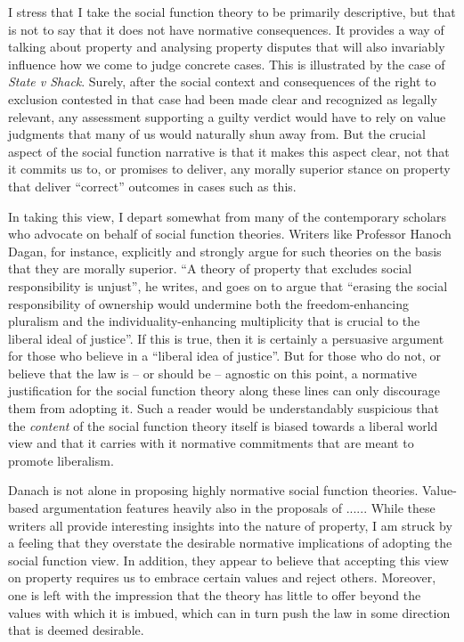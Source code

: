 I stress that I take the social function theory to be primarily descriptive, but that is not to say that it does not have normative consequences. It provides a way of talking about property and analysing property disputes that will also invariably influence how we come to judge concrete cases. This is illustrated by the case of {\it State v Shack}. Surely, after the social context and consequences of the right to exclusion contested in that case had been made clear and recognized as legally relevant, any assessment supporting a guilty verdict would have to rely on value judgments that many of us would naturally shun away from. But the crucial aspect of the social function narrative is that it makes this aspect clear, not that it commits us to, or promises to deliver, any morally superior  stance on property that deliver ``correct'' outcomes in cases such as this.

In taking this view, I depart somewhat from many of the contemporary scholars who advocate on behalf of social function theories. Writers like Professor Hanoch Dagan, for instance, explicitly and strongly argue for such theories on the basis that they are morally superior. ``A theory of property that excludes social responsibility is unjust'', he writes, and goes on to argue that ``erasing the social responsibility of ownership would undermine both the freedom-enhancing pluralism and the individuality-enhancing multiplicity that is crucial to the liberal ideal of justice''. If this is true, then it is certainly a persuasive argument for those who believe in a ``liberal idea of justice''. But for those who do not, or believe that the law is -- or should be -- agnostic on this point, a normative justification for the social function theory along these lines can only discourage them from adopting it. Such a reader would be understandably suspicious that the {\it content} of the social function theory itself is biased towards a liberal world view and that it carries with it normative commitments that are meant to promote liberalism. 

Danach is not alone in proposing highly normative social function theories. Value-based argumentation features heavily also in the proposals of ...... While these writers all provide interesting insights into the nature of property, I am struck by a feeling that they overstate the desirable normative implications of adopting the social function view. In addition, they appear to believe that accepting this view on property requires us to embrace certain values and reject others. Moreover, one is left with the impression that the theory has little to offer beyond the values with which it is imbued, which can in turn push the law in some direction that is deemed desirable. 

